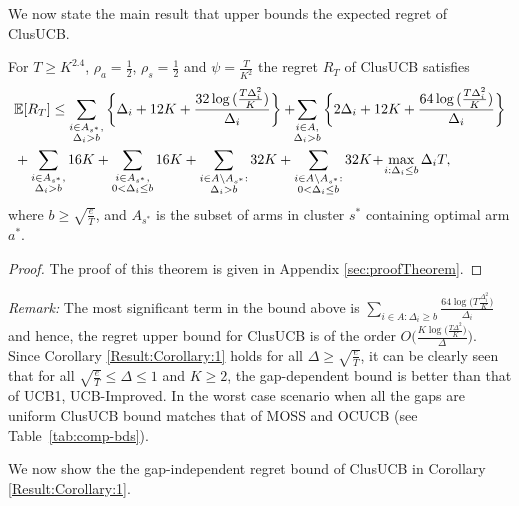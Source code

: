 	
We now state the main result that upper bounds the expected regret of ClusUCB.
\begin{theorem}
\label{Result:Theorem:1}
For $T\geq K^{2.4} $, $\rho_a =\frac{1}{2}$, $\rho_s =\frac{1}{2}$ and $\psi=\frac{T}{K^2}$ the regret $R_T$ of ClusUCB satisfies
\begin{align*}
&\mathbb{E} [R_{T}]\leq 
\sum\limits_{\substack{i\in A_{s^{*}},\\\Delta_{i} > b}}\bigg\lbrace \Delta_{i} + 12K
+ \frac{32\log{(\frac{T\Delta_i^2}{K})}}{\Delta_{i}} \bigg\rbrace
 + \! \! \sum\limits_{\substack{i\in A,\\\Delta_{i} > b}} \bigg\lbrace 2\Delta_{i} +
12K + \frac{64\log{(\frac{T\Delta_i^2}{K})}}{\Delta_{i}} \bigg\rbrace \\
&+ \sum\limits_{\substack{i\in A_{s^{*}},\\ \Delta_{i} > b}} 
16K+\sum\limits_{\substack{i\in A_{s^{*}},\\0 < \Delta_{i}\leq b}} 16K + \sum_{\substack{i\in A\setminus A_{s^*}:\\\Delta_{i}> b}}32K +\sum_{\substack{i\in A \setminus A_{s^*}:\\ 0 < \Delta_{i} \leq b}}32K 
 \!+\! \max\limits_{i:\Delta_{i}\leq b}\Delta_{i}T, 
\end{align*}
where $b\geq \sqrt{\frac{e}{T}}$, and $A_{s^{*}}$ is the subset of arms in cluster $s^{*}$ containing optimal arm $a^{*}$.
\end{theorem}
\begin{proof} The proof of this theorem is given in Appendix \ref{sec:proofTheorem}.
\end{proof}

\textit{Remark:} The most significant term in the bound above is $\sum_{i\in A:\Delta_{i}\geq b}\frac{64\log{\big(T\frac{\Delta_{i}^{2}}{K}\big)}}{\Delta_{i}}$ and hence, the regret upper bound for ClusUCB is of the order $O\bigg(\frac{K\log \big(\frac{T\Delta^{2}}{K}\big)}{\Delta}\bigg)$. Since Corollary \ref{Result:Corollary:1} holds for all $\Delta \geq \sqrt{\frac{e}{T}} $, it can be clearly seen that for all $\sqrt{\frac{e}{T}} \leq \Delta\leq 1$ and $K\geq 2$, the gap-dependent bound is better than that of UCB1, UCB-Improved. In the worst case scenario when all the gaps are uniform ClusUCB bound matches that of MOSS and OCUCB (see Table~\ref{tab:comp-bds}). 


We now show the the gap-independent regret bound of ClusUCB in Corollary \ref{Result:Corollary:1}.


